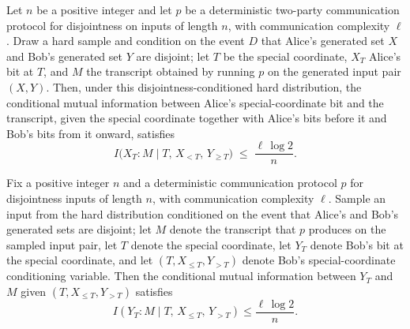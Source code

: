 \begin{theorem}
\label{CommunicationComplexity.Functions.Disjointness.RandomizedLowerBound.aliceInfoTerm_le_average_entropy_bound}
\leanok
{}
Let $n$ be a positive integer and let $p$ be a deterministic two-party communication
protocol for disjointness on inputs of length $n$, with communication complexity $\ell$.
Draw a hard sample and condition on the event $D$ that Alice's generated set $X$ and
Bob's generated set $Y$ are disjoint; let $T$ be the special coordinate, $X_T$ Alice's
bit at $T$, and $M$ the transcript obtained by running $p$ on the generated input pair
$(X,Y)$. Then, under this disjointness-conditioned hard distribution, the conditional
mutual information between Alice's special-coordinate bit and the transcript, given the
special coordinate together with Alice's bits before it and Bob's bits from it onward,
satisfies
\[
I\bigl(X_T : M \mid T,\, X_{<T},\, Y_{\ge T}\bigr) \;\le\; \frac{\ell \,\log 2}{n}.
\]
\end{theorem}

\begin{theorem}
\label{CommunicationComplexity.Functions.Disjointness.RandomizedLowerBound.bobInfoTerm_le_average_entropy_bound}
\leanok
{}
Fix a positive integer $n$ and a deterministic communication protocol $p$ for
disjointness inputs of length $n$, with communication complexity $\ell$. Sample an input
from the hard distribution conditioned on the event that Alice's and Bob's generated
sets are disjoint; let $M$ denote the transcript that $p$ produces on the sampled input
pair, let $T$ denote the special coordinate, let $Y_T$ denote Bob's bit at the special
coordinate, and let $(T, X_{\le T}, Y_{>T})$ denote Bob's special-coordinate
conditioning variable. Then the conditional mutual information between $Y_T$ and $M$
given $(T, X_{\le T}, Y_{>T})$ satisfies
\[
I\!\left(Y_T : M \mid T,\, X_{\le T},\, Y_{>T}\right) \le \frac{\ell \, \log 2}{n}.
\]
\end{theorem}

